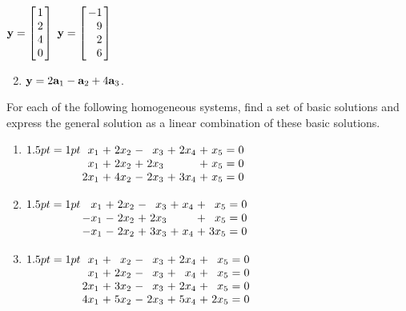 \begin{multicols}{2}
\begin{ex}
\begin{exenumerate}
\exitem 
$\vect{y} =
\leftB \begin{array}{r}
	1 \\
	2 \\
	4 \\
	0
\end{array} \rightB$
\exitem 
$\vect{y} =
\leftB \begin{array}{r}
	-1 \\
	9 \\
	2 \\
	6
\end{array} \rightB$
\end{exenumerate}
\begin{sol}
\begin{enumerate}[label={\alph*.}]
\setcounter{enumi}{1}
\item  $\textbf{y} = 2\textbf{a}_1 - \textbf{a}_2 + 4\textbf{a}_3$.

\end{enumerate}
\end{sol}
\end{ex}

\begin{ex}
For each of the following homogeneous systems, find a set of basic solutions and express the general solution as a linear combination of these basic solutions.

\begin{enumerate}[label={\alph*.}]
\item 
$\arraycolsep=1pt
\begin{array}[t]{rlrlrlrlrcr}
	 x_1 & + & 2x_2 & - &  x_3 & + & 2x_4 & + &  x_5 & = & 0 \\
	 x_1 & + & 2x_2 & + & 2x_3 &   &      & + &  x_5 & = & 0 \\
	2x_1 & + & 4x_2 & - & 2x_3 & + & 3x_4 & + &  x_5 & = & 0
\end{array}$

\item 
$\arraycolsep=1pt
\begin{array}[t]{rlrlrlrlrcr}
	 x_1 & + & 2x_2 & - &  x_3 & + &  x_4 & + &  x_5 & = & 0 \\
	-x_1 & - & 2x_2 & + & 2x_3 &   &      & + &  x_5 & = & 0 \\
	-x_1 & - & 2x_2 & + & 3x_3 & + &  x_4 & + & 3x_5 & = & 0
\end{array}$

\item 
$\arraycolsep=1pt
\begin{array}[t]{rlrlrlrlrcr}
	 x_1 & + &  x_2 & - &  x_3 & + & 2x_4 & + &  x_5 & = & 0 \\
	 x_1 & + & 2x_2 & - &  x_3 & + &  x_4 & + &  x_5 & = & 0 \\
	2x_1 & + & 3x_2 & - &  x_3 & + & 2x_4 & + &  x_5 & = & 0 \\
	4x_1 & + & 5x_2 & - & 2x_3 & + & 5x_4 & + & 2x_5 & = & 0
\end{array}$


\end{enumerate}
\end{ex}
\end{multicols}
